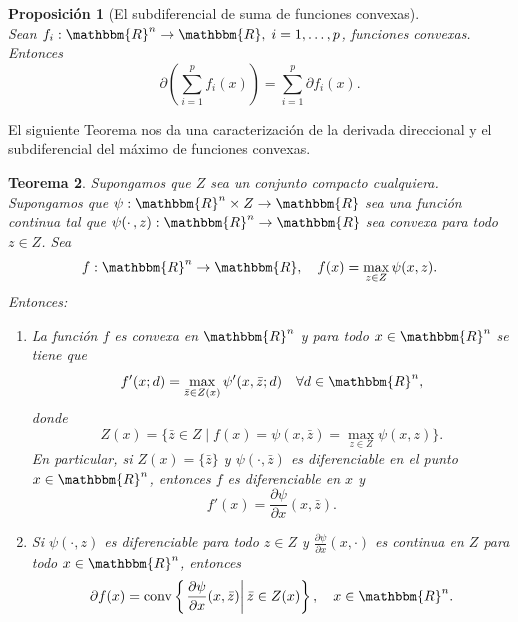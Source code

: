 \documentclass[a4paper,12pt]{report}
\newcommand{\RR}{\mathbbm{R}}
\newcommand{\Rn}{\RR^n}
\newcommand{\sdif}{\partial f(x)}
\newcommand{\arr}{\rightarrow}
\newtheorem{teo}{Teorema}[section]
\newtheorem{prop}[teo]{Proposici\'on}
\begin{document}
\begin{prop}[El subdiferencial de suma de funciones convexas]
\mbox{}\\Sean $f_{i}:\Rn\arr\RR,\;i=1,\ldots,p$, funciones convexas. Entonces
$$\partial \left(\sum_{i=1}^p f_{i}(x)\right)=\sum_{i=1}^p \partial f_{i}(x).$$
\end{prop}

El siguiente Teorema nos da una caracterizaci\'on de la derivada direccional y el subdiferencial del m\'aximo de funciones convexas.

\begin{teo}\label{danskin}
Supongamos que $Z$ sea un conjunto compacto cualquiera. Supongamos que $\psi :\Rn\times Z\arr\RR$ sea una funci\'on continua tal que $\psi(\cdotp,z):\Rn\arr\RR$ sea convexa para todo $z\in Z$. Sea
$$f:\Rn\arr\RR,\quad f(x)=\max_{z\in Z}\psi(x,z).$$
Entonces:
\begin{enumerate}
\item La funci\'on $f$ es convexa en $\Rn$ y  para todo $x\in\Rn$ se tiene que $$f'(x;d)=\max_{\bar{z}\in Z(x)}\psi '(x,\bar{z};d)\quad\forall d\in\Rn,$$
donde $$Z(x)=\{\bar{z}\in Z\mid f(x)=\psi(x,\bar{z})=\max_{z\in Z}\psi(x,z)\}.$$
En particular, si $Z(x)=\{\bar{z}\}$ y $\psi(\cdotp,\bar{z})$ es diferenciable en el punto $x\in\Rn$, entonces $f$ es diferenciable en $x$ y $$f'(x)=\frac{\partial \psi}{\partial x}(x,\bar{z}).$$
\item Si $\psi(\cdotp,z)$ es diferenciable para todo $z\in Z$ y $\frac{\partial \psi}{\partial x}(x,\cdotp)$ es continua en $Z$ para todo $x\in\Rn$, entonces
$$\sdif=\mathrm{conv}\left\{\left.\frac{\partial \psi}{\partial x}(x,\bar{z})\right| \bar{z}\in Z(x)\right\},\quad x\in\Rn.$$
\end{enumerate}
\end{teo}
\end{document}
